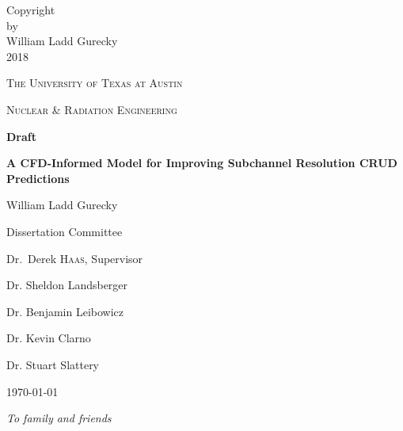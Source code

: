 

\clearpage
\vspace*{\fill}
\thispagestyle{empty} %
\doublespacing
\begin{center}
Copyright \\

by \\

William Ladd Gurecky \\

2018 \\
\end{center}
\singlespacing
\vspace*{\fill}
\pagebreak

\begin{titlepage}
	\centering
	{\scshape\LARGE The University of Texas at Austin \par}
	\vspace{1cm}
	{\scshape\Large Nuclear \& Radiation Engineering \par}
	\vspace{1.5cm}
	
	        {\huge\bfseries Draft \par}
	{\large\bfseries A CFD-Informed Model for Improving Subchannel Resolution CRUD Predictions\par}

	\vspace{2cm}
	{\Large William Ladd Gurecky \par}
	\vfill

	\begin{flushright}
	Dissertation Committee \par
	\bigskip
	Dr.~Derek \textsc{Haas}, Supervisor \par
	Dr. Sheldon Landsberger \par
	Dr. Benjamin Leibowicz \par
	Dr. Kevin Clarno \par
	Dr. Stuart Slattery \par
	\end{flushright}
	\vfill
	{\large \today\par}
\end{titlepage}
\pagebreak


\clearpage
\vspace*{\fill}
\thispagestyle{empty} %
\begin{center}
\em %
To family and friends
\end{center}
\vspace*{\fill}

\pagebreak

